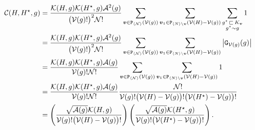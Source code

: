 \documentclass[11pt,reqno]{amsart}
\numberwithin{equation}{section}
\newcommand{\abs}[1]{\left\lvert #1 \right\rvert}
\newcommand{\sprod}[1]{\langle#1\rangle}
\newcommand{\kb}[1]{\boldsymbol{#1}}
\newcommand{\vk}[1]{\kb{#1}}
\begin{document}
\begin{align}
    \mathcal{C}({H},{H^{\star}},g) &= \frac{\mathcal{K}({H},g)\mathcal{K}({H^{\star}},g)\mathcal{A}^2(g)}{\bigl(\mathcal{V}(g)!\bigr)^2\mathcal{N}!}\sum_{\vk v\in {\tt P}_{\sprod{\mathcal{N}}}(\mathcal{V}(g))}\sum_{\vk v_1\in{\tt P}_{\sprod{N}\setminus\vk v}(\mathcal{V}({H})-\mathcal{V}(g))}\sum_{\substack{g^{\star}{\,\sqsubset\,} K_{\vk v} \\ g^{\star}\sim g}}1\notag\\
    &= \frac{\mathcal{K}({H},g)\mathcal{K}({H^{\star}},g)\mathcal{A}^2(g)}{\bigl(\mathcal{V}(g)!\bigr)^2\mathcal{N}!}\sum_{\vk v\in {\tt P}_{\sprod{\mathcal{N}}}(\mathcal{V}(g))}\sum_{\vk v_1\in{\tt P}_{\sprod{N}\setminus\vk v}(\mathcal{V}({H})-\mathcal{V}(g))}\abs{{\tt G}_{\mathcal{V}(g)}(g)}\notag\\
    &= \frac{\mathcal{K}({H},g)\mathcal{K}({H^{\star}},g)\mathcal{A}(g)}{\mathcal{V}(g)!\mathcal{N}!}\sum_{\vk v\in {\tt P}_{\sprod{\mathcal{N}}}(\mathcal{V}(g))}\sum_{\vk v_1\in{\tt P}_{\sprod{N}\setminus\vk v}(\mathcal{V}({H})-\mathcal{V}(g))}1\notag\\
    &= \frac{\mathcal{K}({H},g)\mathcal{K}({H^{\star}},g)\mathcal{A}(g)}{\mathcal{V}(g)!\mathcal{N}!}\frac{\mathcal{N}!}{\mathcal{V}(g)!\bigl(\mathcal{V}({H})-\mathcal{V}(g)\bigr)!\bigl(\mathcal{V}({H^{\star}})-\mathcal{V}(g)\bigr)!}\notag\\
    &=\left(\frac{\sqrt{\mathcal{A}(g)}\mathcal{K}({H},g)}{\mathcal{V}(g)!\bigr(\mathcal{V}({H})-\mathcal{V}(g)\bigl)!}\right)\left(\frac{\sqrt{\mathcal{A}(g)}\mathcal{K}({H^{\star}},g)}{\mathcal{V}(g)!\bigr(\mathcal{V}({H^{\star}})-\mathcal{V}(g)\bigl)!}\right).\label{C_in_K}
\end{align}
\end{document}
